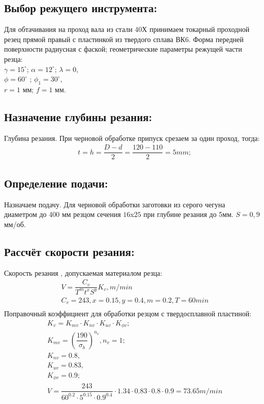 \subsection{Выбор режущего инструмента:}
Для обтачивания на проход вала из стали 40Х принимаем токарный проходной резец прямой правый с пластинкой из твердого сплава ВК6. Форма передней поверхности радиусная с фаской; геометрические параметры режущей части резца:\\
$\gamma=15^{\circ}$; $\alpha=12^{\circ}$; $\lambda=0$,\\ 
$\phi=60^{\circ}$ ; $\phi_1=30^{\circ}$,\\
$r=1$ мм; $f=1$ мм.

\subsection{Назначение глубины резания:}
Глубина резания. При черновой обработке припуск срезаем за один проход, тогда:\\
\begin{equation}
	\begin{split}
		&t=h=\dfrac{D-d}{2}=\dfrac{120-110}{2} = 5 mm;
	\end{split}
\end{equation}

\subsection{Определение подачи:}
Назначаем подачу. Для черновой обработки заготовки из серого чегуна диаметром до 400 мм резцом сечения $16$x$25$ при глубине резания до 5мм. $S=0,9$ мм/об.

\subsection{Рассчёт скорости резания:}
Скорость резания , допускаемая материалом резца:
\begin{equation}
	\begin{split}
		&V=\dfrac{C_v}{T^mt^xS^y}K_v, m/min\\
		&C_v=243, x=0.15, y=0.4, m=0.2, T=60 min\\
	\end{split}
\end{equation}
Поправочный коэффициент для обработки резцом с твердосплавной пластиной:
\begin{equation}
	\begin{split}
		&K_v = K_{mv}\cdot K_{nv}\cdot K_{uv}\cdot K_{\phi v};\\
		&K_{mv} = \left( \dfrac{190}{\sigma_b} \right)^{n_v}, n_v = 1;\\
		&K_{nv}=0.8, \\
		&K_{uv}=0.83, \\
		&K_{\phi v}=0.9; \\
		&V = \dfrac{243}{60^{0.2}\cdot 5^{0.15}\cdot 0.9^{0.4}}\cdot 1.34 \cdot 0.83\cdot 0.8\cdot 0.9 = 73.65 m/min
	\end{split}
\end{equation}


